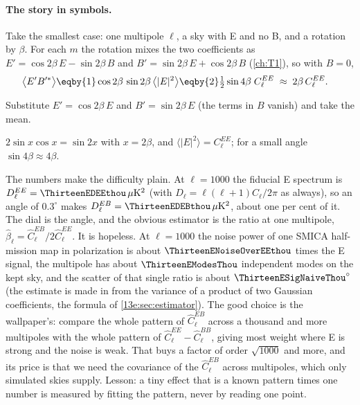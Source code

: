 \paragraph{The story in symbols.} Take the smallest case: one multipole $\ell$, a sky with E and no B,
and a rotation by $\beta$. For each $m$ the rotation mixes the two coefficients as
$E'=\cos2\beta\,E-\sin2\beta\,B$ and $B'=\sin2\beta\,E+\cos2\beta\,B$ (\cref{ch:T1}), so with $B=0$,
\begin{align}
  \bigl\langle E'B'^{*}\bigr\rangle
  &\eqby{1}\cos2\beta\,\sin2\beta\,\bigl\langle|E|^2\bigr\rangle
   \eqby{2}\tfrac12\sin4\beta\;C^{EE}_\ell
   \;\approx\;2\beta\,C^{EE}_\ell .
  \label{13e:eq:smallest}
\end{align}
\begin{explain}
  \item Substitute $E'=\cos2\beta\,E$ and $B'=\sin2\beta\,E$ (the terms in $B$ vanish) and take the mean.
  \item $2\sin x\cos x=\sin2x$ with $x=2\beta$, and $\langle|E|^2\rangle=C^{EE}_\ell$; for a small angle
        $\sin4\beta\approx4\beta$.
\end{explain}
The numbers make the difficulty plain. At $\ell=1000$ the fiducial E spectrum is $D^{EE}_\ell=\ThirteenEDEEthou\,\mu{\rm K}^2$
(with $D_\ell=\ell(\ell+1)C_\ell/2\pi$ as always), so an angle of $0.3^\circ$ makes
$D^{EB}_\ell=\ThirteenEDEBthou\,\mu{\rm K}^2$, about one per cent of it. The dial is the angle, and the
obvious estimator is the ratio at one multipole, $\hat\beta_\ell=\widehat C^{EB}_\ell/2\widehat C^{EE}_\ell$. It is
hopeless. At $\ell=1000$ the noise power of one SMICA half-mission map in polarization is about
$\ThirteenENoiseOverEEthou$ times the E signal, the multipole has about $\ThirteenEModesThou$ independent
modes on the kept sky, and the scatter of that single ratio is about $\ThirteenESigNaiveThou^\circ$ (the
estimate is made in  from the variance of a product of two Gaussian coefficients, the
formula of \cref{13e:sec:estimator}). The good choice is the wallpaper's: compare the whole pattern of
$\widehat C^{EB}_\ell$ across a thousand and more multipoles with the whole pattern of
$\widehat C^{EE}_\ell-\widehat C^{BB}_\ell$, giving most weight where E is strong and the noise is weak.
That buys a factor of order $\sqrt{1000}$ and more, and its price is that we need the covariance of the
$\widehat C^{EB}_\ell$ across multipoles, which only simulated skies supply. Lesson: a tiny effect that is
a known pattern times one number is measured by fitting the pattern, never by reading one point.

